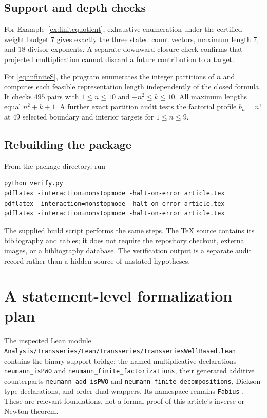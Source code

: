 \documentclass[11pt,a4paper]{article}
\theoremstyle{definition}
\theoremstyle{remark}
\newcommand{\pathcode}[1]{\nolinkurl{#1}}
\begin{document}
\subsection{Support and depth checks}
For Example~\ref{ex:finitequotient}, exhaustive enumeration under the
certified weight budget $7$ gives exactly the three stated count vectors,
maximum length $7$, and $18$ divisor exponents. A separate downward-closure
check confirms that projected multiplication cannot discard a future
contribution to a target.

For \eqref{eq:infiniteS}, the program enumerates the integer partitions of
$n$ and computes each feasible representation length independently of the
closed formula. It checks $495$ pairs with
$1\le n\le10$ and $-n^2\le k\le10$. All maximum lengths equal
$n^2+k+1$. A further exact partition audit tests the factorial profile
$b_n=n!$ at $49$ selected boundary and interior targets for $1\le n\le9$.

\subsection{Rebuilding the package}
From the package directory, run
\begin{verbatim}
python verify.py
pdflatex -interaction=nonstopmode -halt-on-error article.tex
pdflatex -interaction=nonstopmode -halt-on-error article.tex
pdflatex -interaction=nonstopmode -halt-on-error article.tex
\end{verbatim}
The supplied build script performs the same steps. The TeX source contains
its bibliography and tables; it does not require the repository checkout,
external images, or a bibliography database. The verification output is a
separate audit record rather than a hidden source of unstated hypotheses.

\section{A statement-level formalization plan}
\label{sec:formalization}

The inspected Lean module
\pathcode{Analysis/Transseries/Lean/Transseries/TransseriesWellBased.lean}
contains the binary support bridge: the named multiplicative declarations
\pathcode{neumann_isPWO} and
\pathcode{neumann_finite_factorizations}, their generated additive
counterparts \pathcode{neumann_add_isPWO} and
\pathcode{neumann_finite_decompositions}, Dickson-type declarations, and
order-dual wrappers. Its namespace remains \pathcode{Fabius}
\cite{RepoLean}. These are relevant foundations, not a formal proof of
this article's inverse or Newton theorem.
\end{document}
